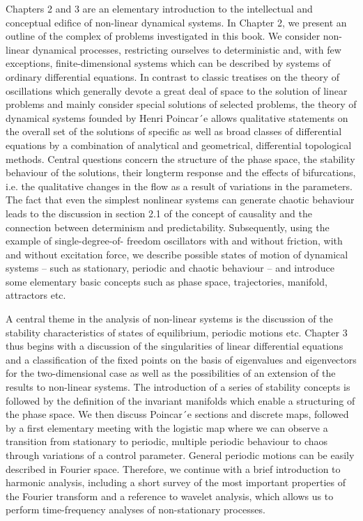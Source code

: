 \documentclass[12pt]{article}
\begin{document}
Chapters 2 and 3 are an elementary introduction to the intellectual and conceptual
edifice of non-linear dynamical systems. In Chapter 2, we present an outline
of the complex of problems investigated in this book. We consider non-linear dynamical
processes, restricting ourselves to deterministic and, with few exceptions,
finite-dimensional systems which can be described by systems of ordinary differential
equations. In contrast to classic treatises on the theory of oscillations which generally
devote a great deal of space to the solution of linear problems and mainly consider
special solutions of selected problems, the theory of dynamical systems founded by
Henri Poincar´e allows qualitative statements on the overall set of the solutions of
specific as well as broad classes of differential equations by a combination of analytical
and geometrical, differential topological methods. Central questions concern
the structure of the phase space, the stability behaviour of the solutions, their longterm
response and the effects of bifurcations, i.e. the qualitative changes in the flow
as a result of variations in the parameters. The fact that even the simplest nonlinear
systems can generate chaotic behaviour leads to the discussion in section 2.1 of
the concept of causality and the connection between determinism and predictability.
Subsequently, using the example of single-degree-of- freedom oscillators with and
without friction, with and without excitation force, we describe possible states of
motion of dynamical systems – such as stationary, periodic and chaotic behaviour
– and introduce some elementary basic concepts such as phase space, trajectories,
manifold, attractors etc.

\hfill

A central theme in the analysis of non-linear systems is the discussion of the stability
characteristics of states of equilibrium, periodic motions etc. Chapter 3 thus
begins with a discussion of the singularities of linear differential equations and a
classification of the fixed points on the basis of eigenvalues and eigenvectors for the
two-dimensional case as well as the possibilities of an extension of the results to
non-linear systems. The introduction of a series of stability concepts is followed by
the definition of the invariant manifolds which enable a structuring of the phase
space. We then discuss Poincar´e sections and discrete maps, followed by a first
elementary meeting with the logistic map where we can observe a transition from
stationary to periodic, multiple periodic behaviour to chaos through variations of
a control parameter. General periodic motions can be easily described in Fourier
space. Therefore, we continue with a brief introduction to harmonic analysis, including
a short survey of the most important properties of the Fourier transform
and a reference to wavelet analysis, which allows us to perform time-frequency analyses
of non-stationary processes.
\end{document}
